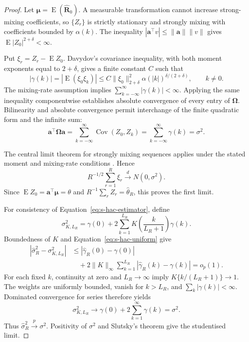\documentclass[namedate,webpdf,modern,mediumone]{oup-authoring-template}
\theoremstyle{thmstyleone}
\begin{document}
\begin{proof}
Let $\boldsymbol\mu=\operatorname E(\widehat{\boldsymbol R}_0)$. A measurable
transformation cannot increase strong-mixing coefficients, so $\{Z_r\}$ is
strictly stationary and strongly mixing with coefficients bounded by
$\alpha(k)$. The inequality
$|\boldsymbol a^\top v|\leq\lVert\boldsymbol a\rVert\lVert v\rVert$ gives
$\operatorname E|Z_0|^{2+\delta}<\infty$.

Put $\xi_r=Z_r-\operatorname EZ_0$. Davydov's covariance inequality, with
both moment exponents equal to $2+\delta$, gives a finite constant $C$ such
that
\begin{equation}
 |\gamma(k)|=|\operatorname E(\xi_0\xi_k)|
 \leq C\lVert\xi_0\rVert_{2+\delta}^2
 \alpha(|k|)^{\delta/(2+\delta)},\qquad k\ne0.
 \label{eq:s-davydov-bound}
\end{equation}
The mixing-rate assumption implies
$\sum_{k=-\infty}^{\infty}|\gamma(k)|<\infty$. Applying the same inequality
componentwise establishes absolute convergence of every entry of
$\boldsymbol\Omega$. Bilinearity and absolute convergence permit interchange
of the finite quadratic form and the infinite sum:
\begin{equation}
 \boldsymbol a^\top\boldsymbol\Omega\boldsymbol a
 =\sum_{k=-\infty}^{\infty}\operatorname{Cov}(Z_0,Z_k)
 =\sum_{k=-\infty}^{\infty}\gamma(k)=\sigma^2.
 \label{eq:s-lrv-quadratic-form}
\end{equation}

The central limit theorem for strongly mixing sequences applies under the
stated moment and mixing-rate conditions 
\citep{ibragimov1971}. Hence
\[
 R^{-1/2}\sum_{r=1}^R\xi_r
 \overset d\longrightarrow N(0,\sigma^2).
\]
Since $\operatorname EZ_0=\boldsymbol a^\top\boldsymbol\mu=\theta$ and
$R^{-1}\sum_rZ_r=\widehat\theta_R$, this proves the first limit.

For consistency of Equation~\eqref{eq:s-hac-estimator}, define
\[
 \sigma_{K,L_R}^2=\gamma(0)+2\sum_{k=1}^{L_R}
 K\left(\frac{k}{L_R+1}\right)\gamma(k).
\]
Boundedness of $K$ and Equation~\eqref{eq:s-hac-uniform} give
\begin{align*}
 |\widehat\sigma_R^2-\sigma_{K,L_R}^2|
 &\leq |\widehat\gamma_R(0)-\gamma(0)| \\
 &\quad+2\lVert K\rVert_\infty
 \sum_{k=1}^{L_R}|\widehat\gamma_R(k)-\gamma(k)|
 =o_p(1).
\end{align*}
For each fixed $k$, continuity at zero and $L_R\to\infty$ imply
$K\{k/(L_R+1)\}\to1$. The weights are uniformly bounded, vanish for
$k>L_R$, and $\sum_k|\gamma(k)|<\infty$. Dominated convergence for series
therefore yields
\[
 \sigma_{K,L_R}^2\longrightarrow
 \gamma(0)+2\sum_{k=1}^{\infty}\gamma(k)=\sigma^2.
\]
Thus $\widehat\sigma_R^2\overset p\longrightarrow\sigma^2$. Positivity of
$\sigma^2$ and Slutsky's theorem give the studentised limit.


\end{proof}
\end{document}
